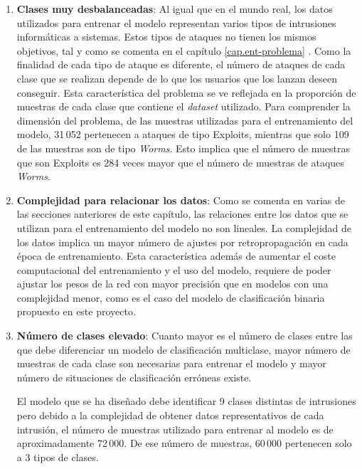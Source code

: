 \begin{enumerate}
	\item \textbf{Clases muy desbalanceadas}: Al igual que en el mundo real, los datos utilizados para entrenar el modelo representan varios tipos de intrusiones informáticas a sistemas. Estos tipos de ataques no tienen los mismos objetivos, tal y como se comenta en el capítulo \ref{cap.ent-problema} . Como la finalidad de cada tipo de ataque es diferente, el número de ataques de cada clase que se realizan depende de lo que los usuarios que los lanzan deseen conseguir. Esta característica del problema se ve reflejada en la proporción de muestras de cada clase que contiene el \textit{dataset} utilizado. Para comprender la dimensión del problema, de las muestras utilizadas para el entrenamiento del modelo, 31\,052 pertenecen a ataques de tipo Exploits, mientras que solo 109 de las muestras son de tipo \textit{Worms}. Esto implica que el número de muestras que son Exploits es 284 veces mayor que el número de muestras de ataques \textit{Worms}.
	
	\item \textbf{Complejidad para relacionar los datos}: Como se comenta en varias de las secciones anteriores de este capítulo, las relaciones entre los datos que se utilizan para el entrenamiento del modelo no son lineales. La complejidad de los datos implica un mayor número de ajustes por retropropagación en cada época de entrenamiento. Esta característica además de aumentar el coste computacional del entrenamiento y el uso del modelo, requiere de poder ajustar los pesos de la red con mayor precisión que en modelos con una complejidad menor, como es el caso del modelo de clasificación binaria propuesto en este proyecto.
	
	\item \textbf{Número de clases elevado}: Cuanto mayor es el número de clases entre las que debe diferenciar un modelo de clasificación multiclase, mayor número de muestras de cada clase son necesarias para entrenar el modelo y mayor número de situaciones de clasificación erróneas existe. 
	
	El modelo que se ha diseñado debe identificar 9 clases distintas de intrusiones pero debido a la complejidad de obtener datos representativos de cada intrusión, el número de muestras utilizado para entrenar al modelo es de aproximadamente 72\,000. De ese número de muestras, 60\,000 pertenecen solo a 3 tipos de clases.
	

\end{enumerate}
